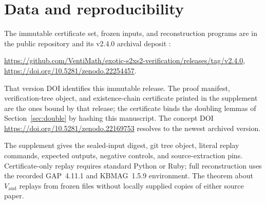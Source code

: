 \documentclass[11pt]{article}
\theoremstyle{definition}
\begin{document}
\section{Data and reproducibility}\label{sec:data}

The immutable certificate set, frozen inputs, and reconstruction
programs are in the public repository and its v2.4.0 archival deposit
\cite{ClydeArtifact}:
\begin{center}
\small\url{https://github.com/VentiMath/exotic-s2xs2-verification/releases/tag/v2.4.0},\\[.3em]
\small\url{https://doi.org/10.5281/zenodo.22254457}.
\end{center}
That version DOI identifies this immutable release.  The proof manifest,
verification-tree object, and existence-chain certificate printed in the
supplement are the ones bound by that release; the certificate binds the
doubling lemmas of Section~\ref{sec:double} by hashing this manuscript.
The concept DOI
\url{https://doi.org/10.5281/zenodo.22169753} resolves to the newest
archived version.

The supplement gives the sealed-input digest, git tree object, literal replay
commands, expected outputs, negative controls, and source-extraction pins.
Certificate-only replay requires standard Python or Ruby; full reconstruction
uses the recorded GAP~4.11.1 and KBMAG~1.5.9 environment.  The theorem about
$V_{\mathrm{aud}}$ replays from frozen files without locally supplied copies
of either source paper.
\end{document}
